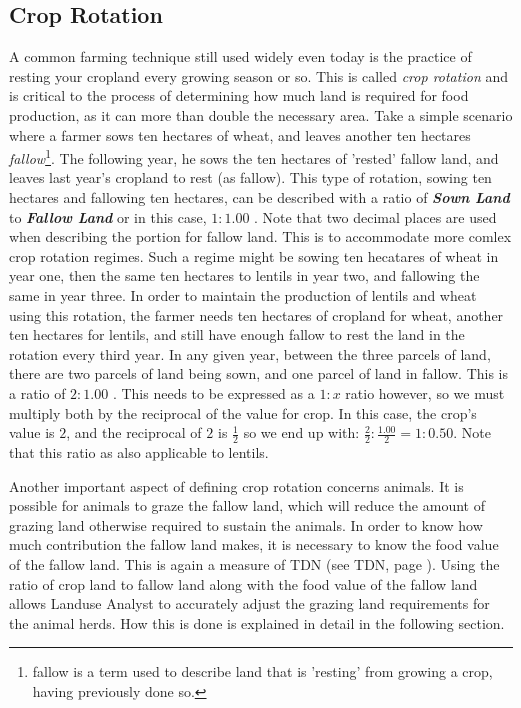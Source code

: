     \subsection{Crop Rotation}
    \label{cropRotation}
    A common farming technique still used widely even today is the practice of
resting your cropland every growing season or so.  This is called \textit{crop
rotation} and is critical to the process of determining how much land is
required for food production, as it can more than double the necessary area. 
Take a simple scenario where a farmer sows ten hectares of wheat, and leaves
another ten hectares \textit{fallow}\footnote{fallow is a term used to describe
land that is 'resting' from growing a crop, having previously done so.}.  The
following year, he sows the ten hectares of 'rested' fallow land, and leaves
last year's cropland to rest (as fallow).  This type of rotation, sowing ten
hectares and fallowing ten hectares, can be described with a ratio of
\textbf{\textit{Sown Land}} to \textbf{\textit{Fallow Land}} or in this case,
$1:1.00$ .  Note that two decimal places are used when describing the portion
for fallow land.  This is to accommodate more comlex crop rotation regimes. 
Such a regime might be sowing ten hecatares of wheat in year one, then the same
ten hectares to lentils in year two, and fallowing the same in year three.  In
order to maintain the production of lentils and wheat using this rotation, the
farmer needs ten hectares of cropland for wheat, another ten hectares for
lentils, and still have enough fallow to rest the land in the rotation every
third year.  In any given year, between the three parcels of land, there are two
parcels of land being sown, and one parcel of land in fallow.  This is a ratio
of $2:1.00$ .  This needs to be expressed as a $1:x$ ratio however, so we must
multiply both by the reciprocal of the value for crop.  In this case, the crop's
value is $2$, and the reciprocal of $2$ is $\frac{1}{2}$ so we end up with:
$\frac{2}{2}:\frac{1.00}{2} = 1:0.50$.  Note that this ratio as also applicable
to lentils.

    Another important aspect of defining crop rotation concerns animals.  It is
possible for animals to graze the fallow land, which will reduce the amount of
grazing land otherwise required to sustain the animals.  In order to know how
much contribution the fallow land makes, it is necessary to know the food value
of the fallow land.  This is again a measure of TDN (see TDN, page
\pageref{TDN}).  Using the ratio of crop land to fallow land along with the food
value of the fallow land allows Landuse Analyst to accurately adjust the grazing
land requirements for the animal herds.  How this is done is explained in detail
in the following section.

